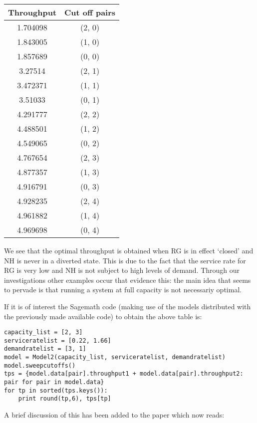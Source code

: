 \documentclass{article}
\begin{document}
\begin{center}
    \begin{tabular}{cc}
        \toprule
        Throughput & Cut off pairs\\
        \midrule
        1.704098 &(2, 0)\\
        1.843005 &(1, 0)\\
        1.857689 &(0, 0)\\
        3.27514 &(2, 1)\\
        3.472371 &(1, 1)\\
        3.51033 &(0, 1)\\
        4.291777 &(2, 2)\\
        4.488501 &(1, 2)\\
        4.549065 &(0, 2)\\
        4.767654 &(2, 3)\\
        4.877357 &(1, 3)\\
        4.916791 &(0, 3)\\
        4.928235 &(2, 4)\\
        4.961882 &(1, 4)\\
        4.969698 &(0, 4)\\
        \bottomrule
    \end{tabular}
\end{center}

We see that the optimal throughput is obtained when RG is in effect `closed'
and NH is never in a diverted state. This is due to the fact that the service
rate for RG is very low and NH is not subject to high levels of demand. Through our investigations other examples occur that evidence this: the main idea that seems to pervade is that running a system at full capacity is not necessariy optimal.

If it is of interest the Sagemath code (making use of the models distributed
with the previously made available code) to obtain the above table is:

\begin{verbatim}
capacity_list = [2, 3]
serviceratelist = [0.22, 1.66]
demandratelist = [3, 1]
model = Model2(capacity_list, serviceratelist, demandratelist)
model.sweepcutoffs()
tps = {model.data[pair].throughput1 + model.data[pair].throughput2: pair for pair in model.data}
for tp in sorted(tps.keys()):
    print round(tp,6), tps[tp]
\end{verbatim}

A brief discussion of this has been added to the paper which now reads:
\end{document}
